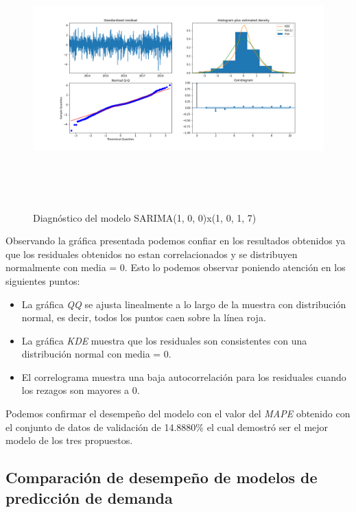 \begin{figure}[H]
  \centering
      \includegraphics[width=\maxwidth,height=10cm]{figures/sarimax_summary.png}  
  \caption{Diagnóstico del modelo SARIMA(1, 0, 0)x(1, 0, 1, 7)}
\end{figure}


Observando la gráfica presentada podemos confiar en los resultados obtenidos ya que los residuales obtenidos no estan correlacionados y se distribuyen normalmente con media = 0. Esto lo podemos observar poniendo atención en los siguientes puntos:

\begin{itemize}
  \item La gráfica \emph{QQ} se ajusta linealmente a lo largo de la muestra con distribución normal, es decir, todos los puntos caen sobre la línea roja.
  \item La gráfica \emph{KDE} muestra que los residuales son consistentes con una distribución normal con media = 0.
  \item El correlograma muestra una baja autocorrelación para los residuales cuando los rezagos son mayores a 0.
\end{itemize}

Podemos confirmar el desempeño del modelo con el valor del \emph{MAPE} obtenido con el conjunto de datos de validación de 14.8880\% el cual demostró ser el mejor modelo de los tres propuestos.

\subsection*{Comparación de desempeño de modelos de predicción de demanda}

